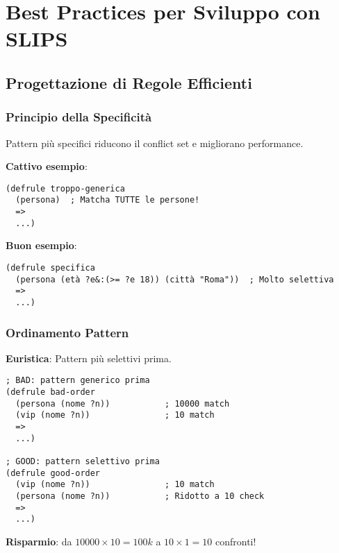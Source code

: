 
\chapter{Best Practices per Sviluppo con SLIPS}
\label{cap:best_practices}

\section{Progettazione di Regole Efficienti}

\subsection{Principio della Specificità}

\begin{infobox}
Pattern più specifici riducono il conflict set e migliorano performance.
\end{infobox}

\textbf{Cattivo esempio}:
\begin{lstlisting}[language=CLIPS]
(defrule troppo-generica
  (persona)  ; Matcha TUTTE le persone!
  =>
  ...)
\end{lstlisting}

\textbf{Buon esempio}:
\begin{lstlisting}[language=CLIPS]
(defrule specifica
  (persona (età ?e&:(>= ?e 18)) (città "Roma"))  ; Molto selettiva
  =>
  ...)
\end{lstlisting}

\subsection{Ordinamento Pattern}

\textbf{Euristica}: Pattern più selettivi prima.

\begin{lstlisting}[language=CLIPS]
; BAD: pattern generico prima
(defrule bad-order
  (persona (nome ?n))           ; 10000 match
  (vip (nome ?n))               ; 10 match
  =>
  ...)

; GOOD: pattern selettivo prima
(defrule good-order
  (vip (nome ?n))               ; 10 match
  (persona (nome ?n))           ; Ridotto a 10 check
  =>
  ...)
\end{lstlisting}

\textbf{Risparmio}: da $10000 \times 10 = 100k$ a $10 \times 1 = 10$ confronti!

